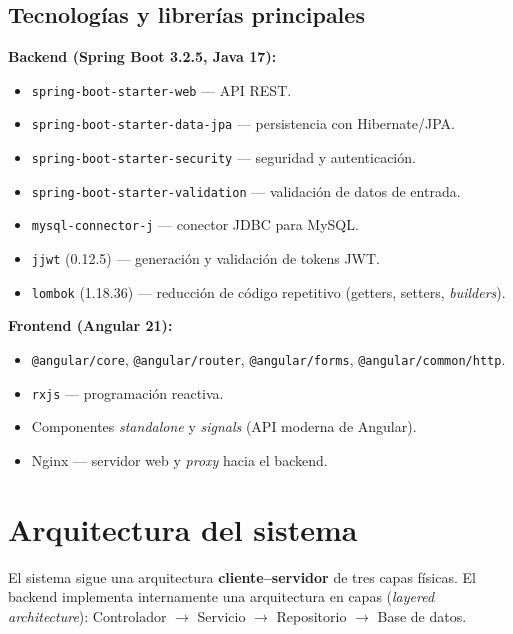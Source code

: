 \documentclass[11pt,a4paper]{article}
\begin{document}
\subsection{Tecnologías y librerías principales}

\textbf{Backend (Spring Boot 3.2.5, Java 17):}
\begin{itemize}[noitemsep]
    \item \texttt{spring-boot-starter-web} --- API REST.
    \item \texttt{spring-boot-starter-data-jpa} --- persistencia con Hibernate/JPA.
    \item \texttt{spring-boot-starter-security} --- seguridad y autenticación.
    \item \texttt{spring-boot-starter-validation} --- validación de datos de entrada.
    \item \texttt{mysql-connector-j} --- conector JDBC para MySQL.
    \item \texttt{jjwt} (0.12.5) --- generación y validación de tokens JWT.
    \item \texttt{lombok} (1.18.36) --- reducción de código repetitivo (getters, setters, \emph{builders}).
\end{itemize}

\textbf{Frontend (Angular 21):}
\begin{itemize}[noitemsep]
    \item \texttt{@angular/core}, \texttt{@angular/router}, \texttt{@angular/forms}, \texttt{@angular/common/http}.
    \item \texttt{rxjs} --- programación reactiva.
    \item Componentes \emph{standalone} y \emph{signals} (API moderna de Angular).
    \item Nginx --- servidor web y \emph{proxy} hacia el backend.
\end{itemize}

\section{Arquitectura del sistema}

El sistema sigue una arquitectura \textbf{cliente--servidor} de tres capas
físicas. El backend implementa internamente una arquitectura en capas
(\emph{layered architecture}): Controlador $\rightarrow$ Servicio
$\rightarrow$ Repositorio $\rightarrow$ Base de datos.
\end{document}
